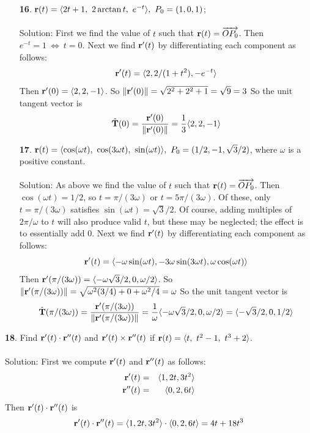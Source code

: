 \documentclass[12pt]{amsbook}
\newcommand{\la}{\langle}
\newcommand{\ra}{\rangle}
\begin{document}
\begin{enumerate}
  \item[{\small\bf 16}.] ${\bf r}(t)=\la 2t+1,\ 2\arctan t,\ e^{-t}\ra, \ P_0=(1,0,1)$;
  \\
  \\
  {\sc Solution}: First we find the value of $t$ such that ${\bf r}(t)=\overrightarrow{OP_0}$. Then $e^{-t}=1 \ \Leftrightarrow  \ t=0$. Next we find ${\bf r}'(t)$ by differentiating each component as follows:
  $${\bf r}'(t)=\la 2,2/(1+t^2),-e^{-t} \ra$$
  Then ${\bf r}'(0)=\la 2,2,-1 \ra$. So $\|{\bf r}'(0)\|=\sqrt{2^2+2^2+1}=\sqrt{9}=3$
  So the unit tangent vector is
  $$\hat{\bf T}(0)=\frac{{\bf r}'(0)}{\|{\bf r}'(0)\|}=\frac{1}{3}\la 2,2,-1 \ra$$
  \item[{\small\bf 17}.] ${\bf r}(t)=\la \cos(\omega t),\ \cos(3\omega t),\ \sin(\omega t)\ra, \ P_0=(1/2,-1,\sqrt{3}/2)$, where $\omega$ is a positive constant.
  \\
  \\
  {\sc Solution}: As above we find the value of $t$ such that ${\bf r}(t)=\overrightarrow{OP_0}$. Then $\cos(\omega t)=1/2$, so $t=\pi/(3\omega)$ or $t=5\pi/(3\omega)$. Of these, only $t=\pi/(3\omega)$  satisfies $\sin(\omega t)=\sqrt{3}/2$. Of course, adding multiples of $2\pi/\omega$ to $t$ will also produce valid $t$, but these may be neglected; the effect is to essentially add $0$. Next we find ${\bf r}'(t)$ by differentiating each component as follows:
  $${\bf r}'(t)=\la -\omega\sin(\omega t),-3\omega\sin(3\omega t),\omega\cos(\omega t) \ra$$
  Then ${\bf r}'(\pi/(3\omega))=\la -\omega \sqrt{3}/2,0,\omega/2 \ra$. So $\|{\bf r}'(\pi/(3\omega))\|=\sqrt{\omega^2(3/4)+0+\omega^2/4}=\omega$
  So the unit tangent vector is
  $$\hat{\bf T}(\pi/(3\omega))=\frac{{\bf r}'(\pi/(3\omega))}{\|{\bf r}'(\pi/(3\omega))\|}=\frac{1}{\omega}\la -\omega \sqrt{3}/2,0,\omega/2 \ra=\la -\sqrt{3}/2,0,1/2 \ra$$
\end{enumerate}
{\small\bf 18}. Find ${\bf r}'(t)\cdot{\bf r}''(t)$ and ${\bf r}'(t)\times{\bf r}''(t)$ if ${\bf r}(t)=\la t, \ t^2-1, \ t^3+2\ra$.
\\
\\
{\sc Solution}: First we compute ${\bf r}'(t)$ and ${\bf r}''(t)$ as follows:
\begin{eqnarray*}
{\bf r}'(t)&=&\la 1,2t,3t^2 \ra\\
{\bf r}''(t)&=&\la 0,2, 6t \ra
\end{eqnarray*}
Then ${\bf r}'(t)\cdot {\bf r}''(t)$ is
$${\bf r}'(t)\cdot {\bf r}''(t)=\la 1,2t,3t^2 \ra\cdot \la 0,2,6t \ra = 4t+18t^3 $$
\end{document}
